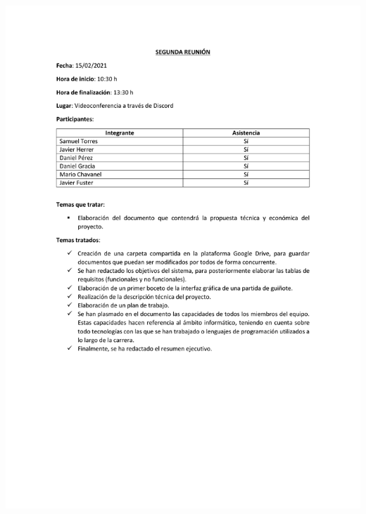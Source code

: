 \documentclass{article}
\begin{document}
\includegraphics[width=\textwidth]{../images/actas/Acta_reunion_2.pdf}
\end{document}
